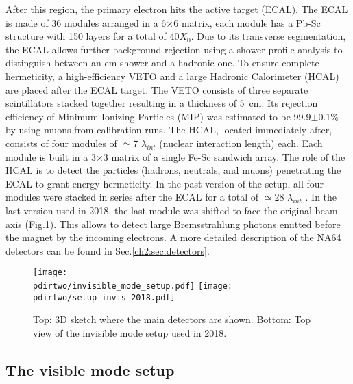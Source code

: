 After this region, the primary electron hits the active target (ECAL). The ECAL is made of 36 modules arranged in a 6$\times$6 matrix, each module has a Pb-Sc structure with 150 layers for a total of 40$X_0$. Due to its transverse segmentation, the ECAL allows further background rejection using a shower profile analysis to distinguish between an em-shower and a hadronic one. To ensure complete hermeticity, a high-efficiency VETO and a large Hadronic Calorimeter (HCAL) are placed after the ECAL target. The VETO consists of three separate scintillators stacked together resulting in a thickness of \SI{5}{\centi\meter}. Its rejection efficiency of Minimum Ionizing Particles (MIP) was estimated to be 99.9$\pm$0.1\% by using muons from calibration runs. The HCAL, located immediately after, consists of four modules of $\simeq$7 $\lambda_{int}$ (nuclear interaction length) each. Each module is built in a 3$\times$3 matrix of a single Fe-Sc sandwich array. The role of the HCAL is to detect the particles (hadrons, neutrals, and muons) penetrating the ECAL to grant energy hermeticity. In the past version of the setup, all four modules were stacked in series after the ECAL for a total of $\simeq$28 $\lambda_{int}$ \cite{Banerjee:2016tad}. In the last version used in 2018, the last module was shifted to face the original beam axis (Fig.\ref{fig:setup-invis-2018}). This allows to detect large Bremsstrahlung photons emitted before the magnet by the incoming electrons. A more detailed description of the NA64 detectors can be found in Sec.\ref{ch2:sec:detectors}.

\begin{figure}[tbh!]
  \centering
  \texttt{[image: \\pdirtwo/invisible\_mode\_setup.pdf]}
\texttt{[image: \\pdirtwo/setup-invis-2018.pdf]}
\caption[Invisible mode setup 2018]{Top: 3D sketch where the main detectors are shown. Bottom: Top view of the invisible mode setup used in 2018.}
\label{fig:setup-invis-2018}
\end{figure}

\subsection{The visible mode setup}
\label{ch2:sec:vismode}

